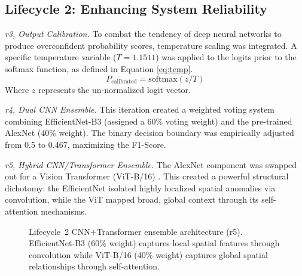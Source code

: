 \documentclass[12pt,a4paper]{report}
\begin{document}
\subsection{Lifecycle 2: Enhancing System Reliability}
\textit{r3, Output Calibration.} To combat the tendency of deep neural networks to produce overconfident probability scores, temperature scaling \cite{guo2017calibration} was integrated. A specific temperature variable ($T = 1.1511$) was applied to the logits prior to the softmax function, as defined in Equation \ref{eq:temp}.
\begin{equation}
P_{\text{calibrated}} = \text{softmax}(z / T)
\label{eq:temp}
\end{equation}
Where $z$ represents the un-normalized logit vector.

\textit{r4, Dual CNN Ensemble.} This iteration created a weighted voting system combining EfficientNet-B3 (assigned a 60\% voting weight) and the pre-trained AlexNet (40\% weight). The binary decision boundary was empirically adjusted from 0.5 to 0.467, maximizing the F1-Score.

\textit{r5, Hybrid CNN/Transformer Ensemble.} The AlexNet component was swapped out for a Vision Transformer (ViT-B/16) \cite{dosovitskiy2020vit}. This created a powerful structural dichotomy: the EfficientNet isolated highly localized spatial anomalies via convolution, while the ViT mapped broad, global context through its self-attention mechanisms.

\begin{figure}[H]
\centering
{}
\caption{Lifecycle~2 CNN+Transformer ensemble architecture (r5). EfficientNet-B3 (60\% weight) captures local spatial features through convolution while ViT-B/16 (40\% weight) captures global spatial relationships through self-attention.}
\label{fig:arch_ensemble_lc2}
\end{figure}
\end{document}
